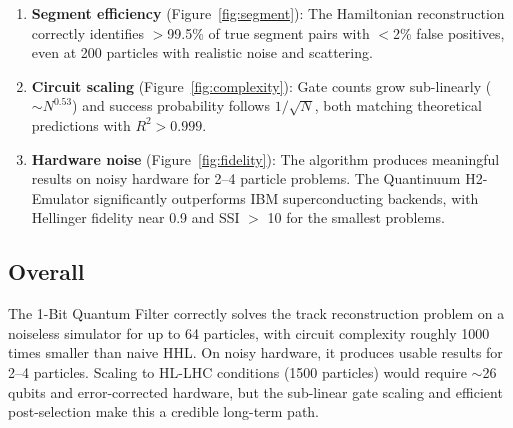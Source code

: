 \documentclass[11pt, a4paper]{article}
\begin{document}
\begin{enumerate}
    \item \textbf{Segment efficiency} (Figure~\ref{fig:segment}): The
          Hamiltonian reconstruction correctly identifies $>$99.5\% of
          true segment pairs with $<$2\% false positives, even at 200
          particles with realistic noise and scattering.

    \item \textbf{Circuit scaling} (Figure~\ref{fig:complexity}): Gate
          counts grow sub-linearly ($\sim N^{0.53}$) and success
          probability follows $1/\sqrt{N}$, both matching theoretical
          predictions with $R^2 > 0.999$.

    \item \textbf{Hardware noise} (Figure~\ref{fig:fidelity}): The
          algorithm produces meaningful results on noisy hardware for
          2--4 particle problems. The Quantinuum H2-Emulator
          significantly outperforms IBM superconducting backends, with
          Hellinger fidelity near 0.9 and SSI $>$ 10 for the smallest
          problems.
\end{enumerate}

\subsection{Overall}

The 1-Bit Quantum Filter correctly solves the track reconstruction
problem on a noiseless simulator for up to 64 particles, with circuit
complexity roughly 1000 times smaller than naive HHL. On noisy hardware,
it produces usable results for 2--4 particles. Scaling to HL-LHC
conditions (1500 particles) would require $\sim$26 qubits and
error-corrected hardware, but the sub-linear gate scaling and efficient
post-selection make this a credible long-term path.
\end{document}
